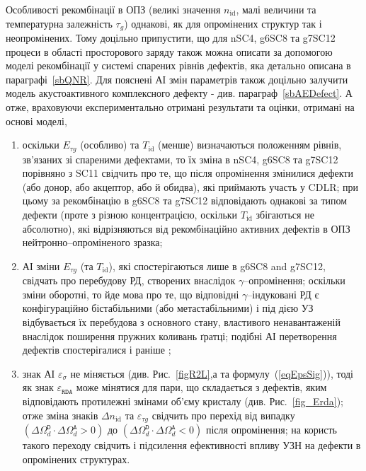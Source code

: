 Особливості рекомбінації в ОПЗ (великі значення $n_\mathrm{id}$, малі величини та температурна залежність $\tau_g$)
однакові, як  для опромінених структур так і неопромінених.
Тому доцільно припустити, що для nSC4, g6SC8 та g7SC12 процеси в області просторового заряду також можна описати
за допомогою моделі рекомбінації у системі спарених рівнів дефектів, яка детально описана в параграфі~\ref{sbQNR}.
Для пояснені АІ змін параметрів також доцільно залучити модель акустоактивного комплексного дефекту - див. параграф~\ref{sbAEDefect}.
А отже, враховуючи експериментально отримані результати та оцінки, отримані на основі моделі,
\begin{enumerate}[label=\asbuk*),leftmargin=0em,itemindent=1.5em]
\item оскільки $E_{\tau g}$ (особливо) та $T_{\mathrm{id}}$ (менше) визначаються положенням рівнів, зв'язаних
зі спареними дефектами, то їх зміна в nSC4, g6SC8 та g7SC12 порівняно з SC11 свідчить про те, що
після опромінення змінилися дефекти (або донор, або акцептор, або й обидва), які приймають участь у CDLR;
при цьому за рекомбінацію в g6SC8 та g7SC12 відповідають однакові за типом дефекти (проте з різною концентрацією,
 оскільки $T_{\mathrm{id}}$ збігаються не абсолютно), які відрізняються від рекомбінаційно активних дефектів в ОПЗ нейтронно--опроміненого зразка;

\item  АІ зміни   $E_{\tau g}$ (та $T_{\mathrm{id}}$), які спостерігаються лише в g6SC8 and g7SC12,
 свідчать про перебудову РД, створених внаслідок $\gamma$--опромінення;
 оскільки зміни оборотні, то йде мова про те, що відповідні
 $\gamma$--індуковані РД є конфігураційно бістабільними (або метастабільними) і під дією УЗ відбувається їх перебудова з основного стану,
 властивого ненавантаженій внаслідок поширення пружних коливань ґратці;
 подібні АІ перетворення дефектів спостерігалися і раніше \cite{Wosinski,Ostapenko1994,YOlikhTPL2011r};

 \item знак АІ $\varepsilon_{\sigma}$ не міняється (див. Рис.~\ref{figR2L},а та формулу~(\ref{eqEpsSig})), тоді як
  знак  $\varepsilon_{\mathtt{RDA}}$  може мінятися для пари, що складається з дефектів, яким відповідають протилежні
  змінами об'єму кристалу (див. Рис.~\ref{fig_Erda});
  отже зміна знаків $\Delta n_{\mathrm{id}}$ та $\varepsilon_{\tau g}$ свідчить про перехід від випадку
  $(\Delta\Omega_d^\mathtt{D}\cdot\Delta\Omega_d^\mathtt{A}>0)$ до
  $(\Delta\Omega_d^\mathtt{D}\cdot\Delta\Omega_d^\mathtt{A}<0)$ після опромінення;
  на користь такого переходу свідчить і підсилення ефективності впливу УЗН на дефекти в опромінених структурах.
\end{enumerate}


